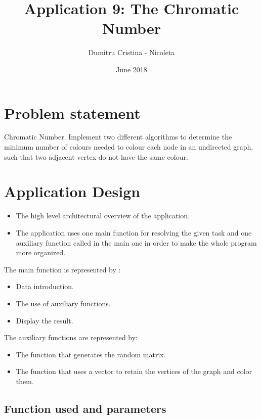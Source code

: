 \documentclass{article}
\title{Application 9: The Chromatic Number}
\author{Dumitru Cristina - Nicoleta }
\date{June 2018}
\begin{document}
\maketitle



\section{Problem statement}
Chromatic Number. Implement two different algorithms to determine the minimum number of colours needed to colour each node in an undirected graph, such
that two adjacent vertex do not have the same colour.

\section{Application Design}

\begin{itemize}
    
\item
The high level architectural overview of the application.
\end{itemize}
\begin{itemize}
  \item The application uses one main function  for resolving the given task and one  auxiliary function called in the main one in order to make the whole program more organized.
  \end{itemize}
  \item The main function is represented by :
  \begin{itemize}
  \item Data introduction.
  \item The use of auxiliary functions.
  \item Display the result.
  \end{itemize}
  \item The auxiliary functions are represented by:
  \begin{itemize}
   \item The function that generates the random matrix.
   \item The function that uses a vector to retain the vertices of the graph and color them.
      \end{itemize}	
      
\newpage
\subsection{Function used and parameters}
\end{document}
